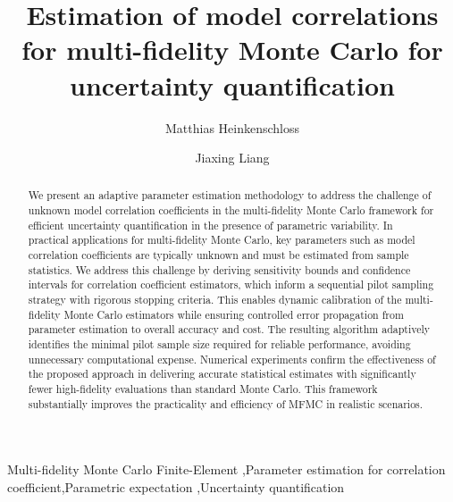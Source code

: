 \documentclass[final,3p,times,11pt]{elsarticle}
\begin{document}
\begin{frontmatter}
\title{Estimation of model correlations for multi-fidelity Monte Carlo for uncertainty quantification}


\author[umdcs]{Matthias Heinkenschloss}
\address[umdcs]{Department of Computational Applied Mathematics and Operations Research and the Ken Kennedy Institute, Rice University.}
\author[umdm]{Jiaxing Liang}
\address[umdm]{Department of Computational Applied Mathematics and Operations Research, Rice University.}
\begin{abstract}
We present an adaptive parameter estimation methodology to address the challenge of unknown model correlation coefficients in the multi-fidelity Monte Carlo framework for efficient uncertainty quantification in the presence of parametric variability. In practical applications for multi-fidelity Monte Carlo, key parameters such as model correlation coefficients are typically unknown and must be estimated from sample statistics. We address this challenge by deriving sensitivity bounds and confidence intervals for correlation coefficient estimators, which inform a sequential pilot sampling strategy with rigorous stopping criteria. This enables dynamic calibration of the multi-fidelity Monte Carlo estimators while ensuring controlled error propagation from parameter estimation to overall accuracy and cost. The resulting algorithm adaptively identifies the minimal pilot sample size required for reliable performance, avoiding unnecessary computational expense. Numerical experiments confirm the effectiveness of the proposed approach in delivering accurate statistical estimates with significantly fewer high-fidelity evaluations than standard Monte Carlo. This framework substantially improves the practicality and efficiency of MFMC in realistic scenarios.
\end{abstract}

\begin{keyword}
Multi-fidelity Monte Carlo Finite-Element \sep Parameter estimation for correlation coefficient\sep Parametric expectation \sep Uncertainty quantification
%
\MSC[2020] 
\end{keyword}
\end{frontmatter}

 
 
% 










% 

\end{document}
